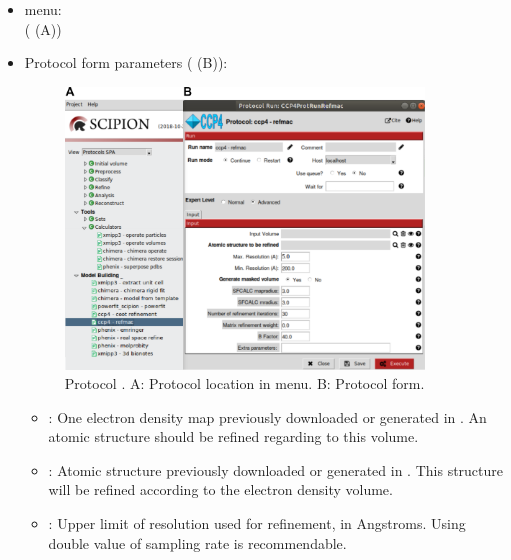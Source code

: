 \begin{itemize}
  \item \scipion menu:\\
    ( (A))\\
  
  \item Protocol form parameters ( (B)):\\
  
    \begin{figure}[H]
     \centering 
     \captionsetup{width=.7\linewidth} 
     \includegraphics[width=0.90\textwidth]{Images_appendix/Fig126.pdf}
     \caption{Protocol . A: Protocol location in \scipion menu. B: Protocol form.}
     \label{fig:app_protocol_refmac_1}
    \end{figure}

    \begin{itemize}
     \item {}: One electron density map previously downloaded or generated in \scipion. An atomic structure should be refined regarding to this volume.
     
     \item {}: Atomic structure previously downloaded or generated in \scipion. This structure will be refined according to the electron density volume.
     
     \item {}: Upper limit of resolution used for refinement, in Angstroms. Using double value of sampling rate is recommendable. 
     

\end{itemize}
\end{itemize}
